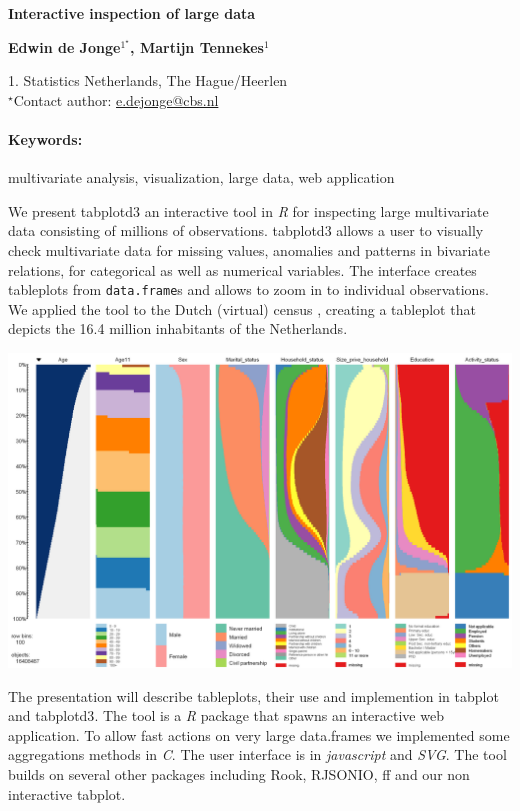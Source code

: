 \documentclass[11pt, a4paper]{article}
\newcommand{\pkg}[1]{{\normalfont\fontseries{b}\selectfont #1}}
\let\proglang=\textit
\let\code=\texttt
\renewcommand{\title}[1]{\begin{center}{\bf \LARGE #1}\end{center}}
\newcommand{\keywords}{\paragraph{Keywords:}}
\begin{document}
\pagestyle{empty}

\title{Interactive inspection of large data}

\begin{center}
  {\bf Edwin de Jonge$^{1^\star}$, Martijn Tennekes$^{1}$}
\end{center}

\begin{affiliations}
1. Statistics Netherlands, The Hague/Heerlen\\[-2pt]
$^\star$Contact author: \href{mailto:e.dejonge@cbs.nl}{e.dejonge@cbs.nl}\\
\end{affiliations}

\keywords multivariate analysis, visualization, large data, web application

\vskip 0.8cm

We present \pkg{tabplotd3} an interactive tool in \proglang{R} for inspecting large multivariate data consisting of millions of observations. 
\pkg{tabplotd3} allows a user to visually check multivariate data for missing values, anomalies and patterns in bivariate relations, for categorical as well as numerical variables. The interface creates tableplots \citep{malik10} from \code{data.frame}s and allows to zoom in to individual observations. We applied the tool to the Dutch (virtual) census \citep{schulte}, creating a tableplot that depicts the 16.4 million inhabitants of the Netherlands. \\ 

  \begin{center}
    \includegraphics[scale=0.6]{VT2008}
  \end{center}
  
The presentation will describe tableplots, their use and implemention in \pkg{tabplot}\citep{tennekes11} and \pkg{tabplotd3}. The tool is a \proglang{R} package that spawns an interactive web application. To allow fast actions on very large data.frames we implemented some aggregations methods in \proglang{C}. The user interface is in \proglang{javascript} and \proglang{SVG}. 
The tool builds on several other packages including \pkg{Rook}, \pkg{RJSONIO}, \pkg{ff} and our non interactive \pkg{tabplot}.



\end{document}
